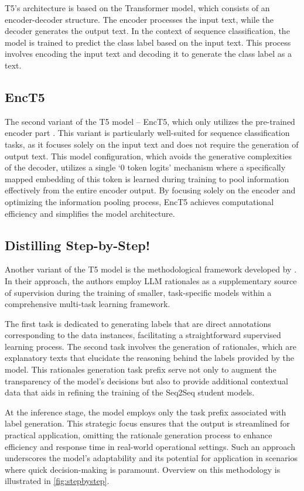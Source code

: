 T5's architecture is based on the Transformer model, which consists of an encoder-decoder structure. The encoder processes the input text, while the decoder generates the output text. In the context of sequence classification, the model is trained to predict the class label based on the input text. This process involves encoding the input text and decoding it to generate the class label as a text.

\subsection{EncT5}

The second variant of the T5 model -- EncT5, which only utilizes the pre-trained encoder part \cite{enct5}. This variant is particularly well-suited for sequence classification tasks, as it focuses solely on the input text and does not require the generation of output text. This model configuration, which avoids the generative complexities of the decoder, utilizes a single `0 token logits' mechanism where a specifically mapped embedding of this token is learned during training to pool information effectively from the entire encoder output. By focusing solely on the encoder and optimizing the information pooling process, EncT5 achieves computational efficiency and simplifies the model architecture.

\subsection{Distilling Step-by-Step!}

Another variant of the T5 model is the methodological framework developed by \citeauthor{stepbystep} \cite{stepbystep}. In their approach, the authors employ LLM rationales as a supplementary source of supervision during the training of smaller, task-specific models within a comprehensive multi-task learning framework.

The first task is dedicated to generating labels that are direct annotations corresponding to the data instances, facilitating a straightforward supervised learning process. The second task involves the generation of rationales, which are explanatory texts that elucidate the reasoning behind the labels provided by the model. This rationales generation task prefix serve not only to augment the transparency of the model’s decisions but also to provide additional contextual data that aids in refining the training of the Seq2Seq student models.

At the inference stage, the model employs only the task prefix associated with label generation. This strategic focus ensures that the output is streamlined for practical application, omitting the rationale generation process to enhance efficiency and response time in real-world operational settings. Such an approach underscores the model's adaptability and its potential for application in scenarios where quick decision-making is paramount. Overview on this methodology is illustrated in \autoref{fig:stepbystep}.

